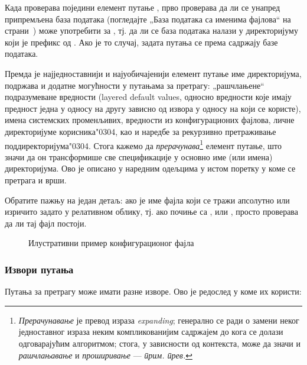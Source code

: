 \documentclass{article}
\begin{document}
Када проверава поједини елемент путање , \KPS{} прво проверава
да ли се унапред припремљена база података (погледајте „База података
са именима фајлова“ на страни~\pageref{sec:filename-database}) може
употребити за , тј. да ли се база података налази у
директоријуму који је префикс од . Ако је то случај, задата
путања се  према садржају базе података.

Премда је најједноставнији и најуобичајенији елемент путање име
директоријума, \KPS{} подржава и додатне могућности у путањама за
претрагу: „рашчлањене“ подразумеване вредности (\textenglish{layered
default values}, односно вредности које имају предност једна у односу
на другу зависно од извора у односу на који се користе), имена
системских променљивих, вредности из конфигурационих фајлова, личне
директоријуме корисника\char"0304, као и наредбе за рекурзивно
претраживање поддиректоријума\char"0304. Стога кажемо да \KPS{}
\emph{прерачунава}\footnote{\textserbian{\emph{Прерачунавање} је
превод израза \textenglish{\emph{expanding}; генерално се ради о
замени неког једноставног израза неким компликованијим садржајем до
кога се долази одговарајућим алгоритмом; стога, у зависности од
контекста, може да значи и \emph{рашчлањавање} и \emph{проширивање}}
--- \emph{прим. прев.}}} елемент путање, што значи да он трансформише
све спецификације у основно име (или имена) директоријума. Ово је
описано у наредним одељцима у истом поретку у коме се претрага и врши.

Обратите пажњу на један детаљ: ако је име фајла који се тражи
апсолутно или изричито задато у релативном облику, тј. ако почиње са
\samp{/},  или , \KPS{} просто проверава да ли тај
фајл постоји.

\ifSingleColumn
\else
\begin{figure*}

\setlength{\abovecaptionskip}{0pt}
  \caption{Илустративни пример конфигурационог фајла}
  \label{fig:config-sample}
\end{figure*}
\fi

\subsubsection{Извори путања}
\label{sec:path-sources}

Путања за претрагу може имати разне изворе. Ово је редослед у коме их
\KPS{} користи:
\end{document}
